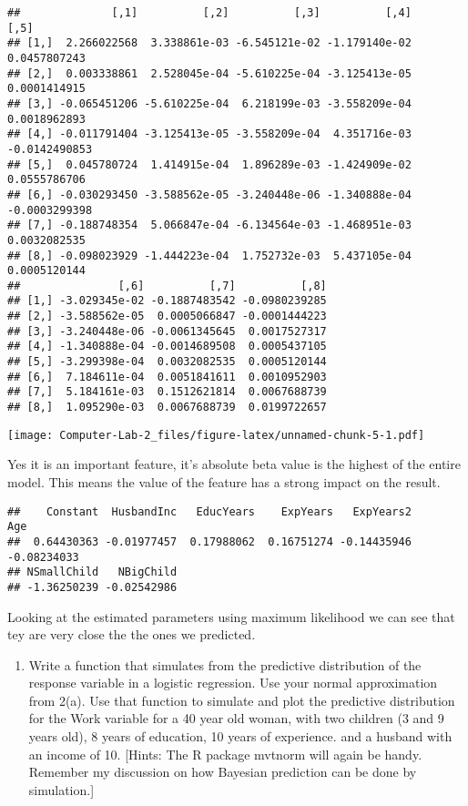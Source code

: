 \documentclass[]{article}
\providecommand{\tightlist}{%
  \setlength{\itemsep}{0pt}\setlength{\parskip}{0pt}}
\begin{document}
\begin{verbatim}
##              [,1]          [,2]          [,3]          [,4]          [,5]
## [1,]  2.266022568  3.338861e-03 -6.545121e-02 -1.179140e-02  0.0457807243
## [2,]  0.003338861  2.528045e-04 -5.610225e-04 -3.125413e-05  0.0001414915
## [3,] -0.065451206 -5.610225e-04  6.218199e-03 -3.558209e-04  0.0018962893
## [4,] -0.011791404 -3.125413e-05 -3.558209e-04  4.351716e-03 -0.0142490853
## [5,]  0.045780724  1.414915e-04  1.896289e-03 -1.424909e-02  0.0555786706
## [6,] -0.030293450 -3.588562e-05 -3.240448e-06 -1.340888e-04 -0.0003299398
## [7,] -0.188748354  5.066847e-04 -6.134564e-03 -1.468951e-03  0.0032082535
## [8,] -0.098023929 -1.444223e-04  1.752732e-03  5.437105e-04  0.0005120144
##               [,6]          [,7]          [,8]
## [1,] -3.029345e-02 -0.1887483542 -0.0980239285
## [2,] -3.588562e-05  0.0005066847 -0.0001444223
## [3,] -3.240448e-06 -0.0061345645  0.0017527317
## [4,] -1.340888e-04 -0.0014689508  0.0005437105
## [5,] -3.299398e-04  0.0032082535  0.0005120144
## [6,]  7.184611e-04  0.0051841611  0.0010952903
## [7,]  5.184161e-03  0.1512621814  0.0067688739
## [8,]  1.095290e-03  0.0067688739  0.0199722657
\end{verbatim}

\texttt{[image: Computer-Lab-2\_files/figure-latex/unnamed-chunk-5-1.pdf]}

Yes it is an important feature, it's absolute beta value is the highest
of the entire model. This means the value of the feature has a strong
impact on the result.

\begin{verbatim}
##    Constant  HusbandInc   EducYears    ExpYears   ExpYears2         Age 
##  0.64430363 -0.01977457  0.17988062  0.16751274 -0.14435946 -0.08234033 
## NSmallChild   NBigChild 
## -1.36250239 -0.02542986
\end{verbatim}

Looking at the estimated parameters using maximum likelihood we can see
that tey are very close the the ones we predicted.

\begin{enumerate}
\def\labelenumi{(\alph{enumi})}
\setcounter{enumi}{1}
\tightlist
\item
  Write a function that simulates from the predictive distribution of
  the response variable in a logistic regression. Use your normal
  approximation from 2(a). Use that function to simulate and plot the
  predictive distribution for the Work variable for a 40 year old woman,
  with two children (3 and 9 years old), 8 years of education, 10 years
  of experience. and a husband with an income of 10. {[}Hints: The R
  package mvtnorm will again be handy. Remember my discussion on how
  Bayesian prediction can be done by simulation.{]}
\end{enumerate}
\end{document}
